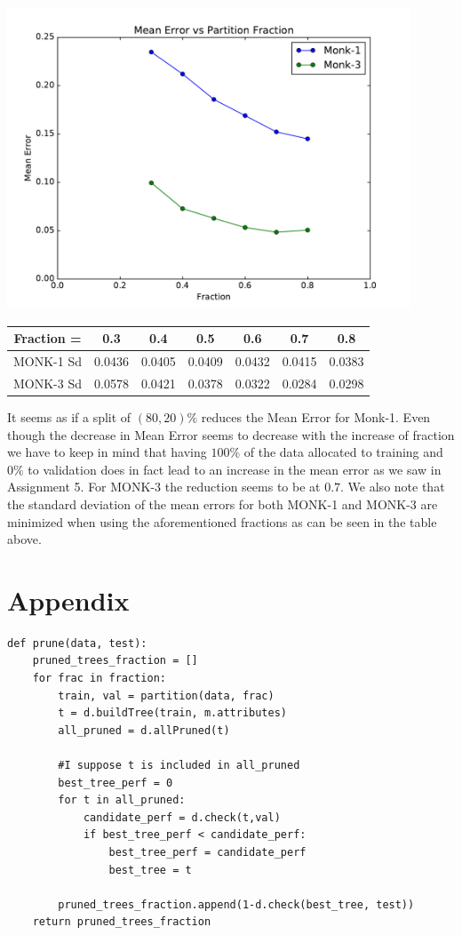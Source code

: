 \documentclass{article}
\begin{document}
\includegraphics[width = 12cm]{figure_1.pdf}

\begin{center}
 \begin{tabular}{|c c c c c c c|} 
 \hline
 Fraction = & 0.3 & 0.4 & 0.5 & 0.6 & 0.7 & 0.8  \\ [0.5ex] 
 \hline 
 MONK-1 Sd \vline & 0.0436 & 0.0405 & 0.0409 & 0.0432 & 0.0415 & 0.0383 \\ 
 \hline
 MONK-3 Sd  \vline & 0.0578 & 0.0421 & 0.0378 & 0.0322 & 0.0284 & 0.0298 \\ [1ex] 
 \hline
\end{tabular}

It seems as if a split of $(80,20)\%$ reduces the Mean Error for Monk-1. Even though the decrease in Mean Error seems to decrease with the increase of fraction we have to keep in mind that having $100\%$ of the data allocated to training and $0\%$ to validation does in fact lead to an increase in the mean error as we saw in Assignment 5. For MONK-3 the reduction seems to be at $0.7$. We also note that the standard deviation of the mean errors for both MONK-1 and MONK-3 are minimized when using the aforementioned fractions as can be seen in the table above.

\end{center}

\section*{Appendix}

\begin{lstlisting}
def prune(data, test):
	pruned_trees_fraction = []
	for frac in fraction:
		train, val = partition(data, frac)
		t = d.buildTree(train, m.attributes)
		all_pruned = d.allPruned(t)
		
		#I suppose t is included in all_pruned
		best_tree_perf = 0
		for t in all_pruned:
			candidate_perf = d.check(t,val)
			if best_tree_perf < candidate_perf:
				best_tree_perf = candidate_perf
				best_tree = t
		
		pruned_trees_fraction.append(1-d.check(best_tree, test))
	return pruned_trees_fraction
\end{lstlisting}
\end{document}
